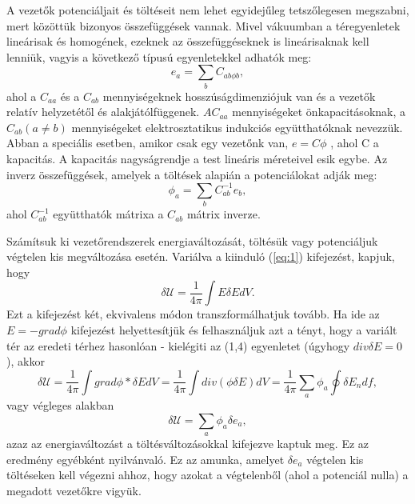 \documentclass{article}
\begin{document}
A vezetők potenciáljait és töltéseit nem lehet egyidejűleg tetszőlegesen megszabni, mert közöttük bizonyos összefüggések vannak. Mivel vákuumban a téregyenletek lineárisak és homogének, ezeknek az összefüggéseknek is lineárisaknak kell lenniük, vagyis a következő típusú egyenletekkel adhatók meg:
\begin{equation} \label{eq:5}
    e_a = \sum\limits_{b} C_{ab\phi b} ,
\end{equation}
ahol a $C_{aa}$ és a $C_{ab}$ mennyiségeknek hosszúságdimenziójuk van és a vezetők relatív helyzetétől és alakjátólfüggenek. $AC_{aa}$ mennyiségeket önkapacitásoknak, a $C_{ab}(a \neq b)$ mennyiségeket elektrosztatikus indukciós együtthatóknak nevezzük. Abban a
speciális esetben, amikor csak egy vezetőnk van, $e = C\phi$ , ahol C a kapacitás. A kapacitás nagyságrendje a test lineáris méreteivel esik egybe. Az inverz összefüggések, amelyek a töltések alapián a potenciálokat adják meg:
\begin{equation} \label{eq:6}
    \phi_a = \sum\limits_{b} C_{ab}^{-1} e_b ,
\end{equation}
ahol $C_{ab}^{-1}$ együtthatók mátrixa a $C_{ab}$ mátrix inverze.

Számítsuk ki vezetőrendszerek energiaváltozását, töltésük vagy potenciáljuk végtelen kis megváltozása esetén. Variálva a kiinduló (\ref{eq:1}) kifejezést, kapjuk, hogy
\begin{equation} \label{eq:7}
    \delta \mathcal{U} = \frac{1}{4 \pi} \int E \delta EdV .
\end{equation}
Ezt a kifejezést két, ekvivalens módon transzformálhatjuk tovább. Ha ide az $E = -grad\phi$ kifejezést helyettesítjük és felhasználjuk azt a tényt, hogy a variált tér az eredeti térhez hasonlóan - kielégiti az (1,4) egyenletet (úgyhogy $div \delta E = 0$), akkor
\begin{equation} \label{eq:8}
    \delta \mathcal{U} = \frac{1}{4 \pi} \int grad \phi * \delta EdV = \frac{1}{4\pi} \int div(\phi \delta E)dV = \frac{1}{4\pi} \sum\limits_a \phi_a \oint \delta E_n df,
\end{equation}
vagy végleges alakban
\begin{equation} \label{eq:9}
    \delta \mathcal{U} = \sum\limits_a \phi_a \delta e_a ,
\end{equation}
azaz az energiaváltozást a töltésváltozásokkal kifejezve kaptuk meg. Ez az eredmény egyébként nyilvánvaló. Ez az amunka, amelyet $\delta e_a$ végtelen kis töltéseken kell végezni ahhoz, hogy azokat a végtelenből (ahol a potenciál nulla) a megadott vezetőkre vigyük.
\end{document}
